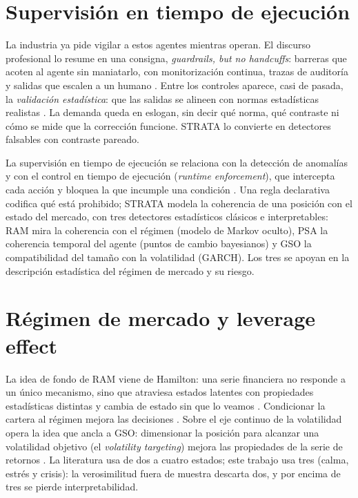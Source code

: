 \section{Supervisión en tiempo de ejecución}
\label{sec:supervision}

La industria ya pide vigilar a estos agentes mientras operan. El discurso profesional lo resume en una consigna, \emph{guardrails, but no handcuffs}: barreras que acoten al agente sin maniatarlo, con monitorización continua, trazas de auditoría y salidas que escalen a un humano \cite{milligan2024guardrails}. Entre los controles aparece, casi de pasada, la \emph{validación estadística}: que las salidas se alineen con normas estadísticas realistas \cite{milligan2024guardrails}. La demanda queda en eslogan, sin decir qué norma, qué contraste ni cómo se mide que la corrección funcione. STRATA lo convierte en detectores falsables con contraste pareado.

La supervisión en tiempo de ejecución se relaciona con la detección de anomalías \cite{chandola2009anomaly} y con el control en tiempo de ejecución (\emph{runtime enforcement}), que intercepta cada acción y bloquea la que incumple una condición \cite{wang2025agentspec, flehmig2025reliability}. Una regla declarativa codifica qué está prohibido; STRATA modela la coherencia de una posición con el estado del mercado, con tres detectores estadísticos clásicos e interpretables: RAM mira la coherencia con el régimen (modelo de Markov oculto), PSA la coherencia temporal del agente (puntos de cambio bayesianos) y GSO la compatibilidad del tamaño con la volatilidad (GARCH). Los tres se apoyan en la descripción estadística del régimen de mercado y su riesgo.

\section{Régimen de mercado y leverage effect}
\label{sec:regimen}

La idea de fondo de RAM viene de Hamilton: una serie financiera no responde a un único mecanismo, sino que atraviesa estados latentes con propiedades estadísticas distintas y cambia de estado sin que lo veamos \cite{hamilton1989}. Condicionar la cartera al régimen mejora las decisiones \cite{ang2002regime, guidolin2007regime}. Sobre el eje continuo de la volatilidad opera la idea que ancla a GSO: dimensionar la posición para alcanzar una volatilidad objetivo (el \emph{volatility targeting}) mejora las propiedades de la serie de retornos \cite{moreira2017}. La literatura usa de dos \cite{ang2002regime} a cuatro \cite{guidolin2007regime} estados; este trabajo usa tres (calma, estrés y crisis): la verosimilitud fuera de muestra descarta dos, y por encima de tres se pierde interpretabilidad.

